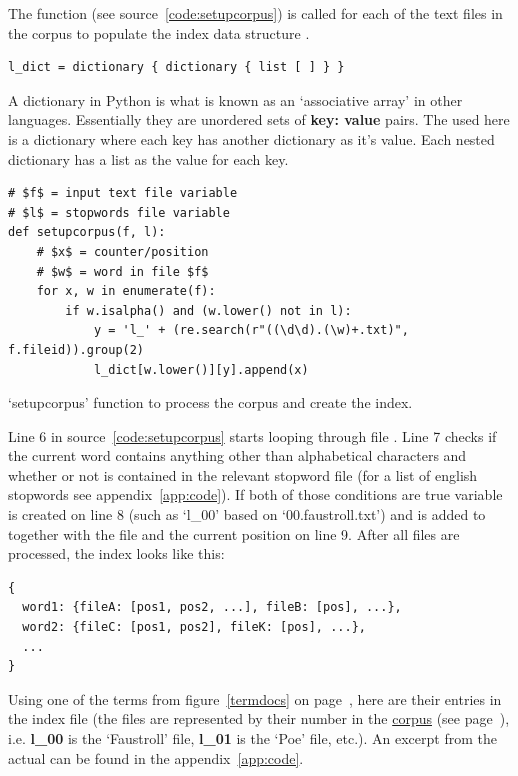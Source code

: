 The  function (see source~\ref{code:setupcorpus}) is called for each of the text files in the corpus to populate the index data structure .

\begin{verbatim}
l_dict = dictionary { dictionary { list [ ] } }
\end{verbatim}

A dictionary in Python is what is known as an `associative array' in other languages. Essentially they are unordered sets of \textbf{key: value} pairs. The  used here is a dictionary where each key has another dictionary as it's value. Each nested dictionary has a list as the value for each key.

\begin{listing}
  \begin{verbatim}
# $f$ = input text file variable
# $l$ = stopwords file variable
def setupcorpus(f, l):
    # $x$ = counter/position
    # $w$ = word in file $f$
    for x, w in enumerate(f):
        if w.isalpha() and (w.lower() not in l):
            y = 'l_' + (re.search(r"((\d\d).(\w)+.txt)", f.fileid)).group(2)
            l_dict[w.lower()][y].append(x)
  \end{verbatim}
\caption{`setupcorpus' function to process the corpus and create the index.}
\label{code:setupcorpus}
\end{listing}

Line 6 in source~\ref{code:setupcorpus} starts looping through file . Line 7 checks if the current word  contains anything other than alphabetical characters and whether or not  is contained in the relevant stopword file  (for a list of english stopwords see appendix~\ref{app:code}). If both of those conditions are true variable  is created on line 8 (such as `l\_00' based on `00.faustroll.txt') and  is added to  together with the file  and the current position  on line 9. After all files are processed, the index looks like this:

\begin{verbatim}
{
  word1: {fileA: [pos1, pos2, ...], fileB: [pos], ...},
  word2: {fileC: [pos1, pos2], fileK: [pos], ...},
  ...
}
\end{verbatim}

Using one of the terms from figure~\ref{termdocs} on page~\pageref{termdocs}, here are their entries in the index file (the files are represented by their number in the \hyperlink{corpus}{corpus} (see page~\pageref{ref:corpus}), i.e. \textbf{l\_00} is the `Faustroll' file, \textbf{l\_01} is the `Poe' file, etc.). An excerpt from the actual  can be found in the appendix~\ref{app:code}.

